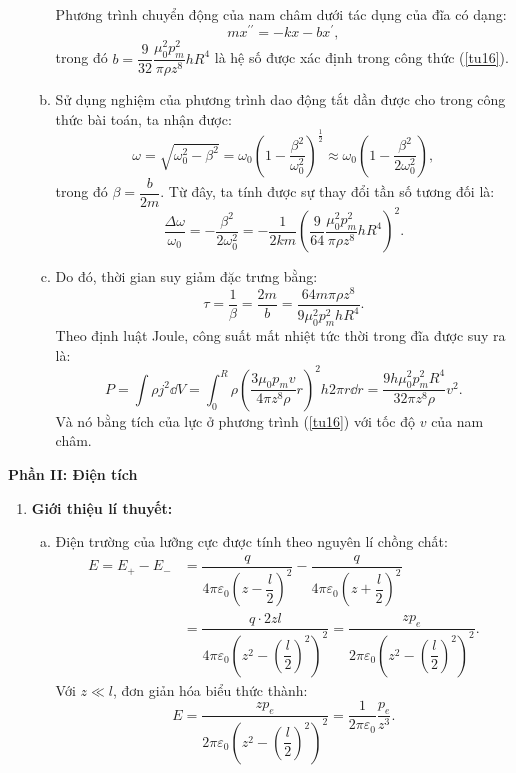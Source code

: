 \begin{loigiai}
\begin{enumerate}[1)]
\begin{enumerate}[a)]
\begin{align*}
\end{align*}
Phương trình chuyển động của nam châm dưới tác dụng của đĩa có dạng:
\[
m x^{\prime \prime}=-k x-b x^{\prime}, \tag{17}
\]
trong đó $b=\dfrac{9}{32} \dfrac{\mu_{0}^{2} p_{m}^{2}}{\pi \rho z^{8}} h R^{4}$ là hệ số được xác định trong công thức (\ref{tu16}).
\item Sử dụng nghiệm của phương trình dao động tắt dần được cho trong công thức bài toán, ta nhận được:
\[
\omega=\sqrt{\omega_{0}^{2}-\beta^{2}}=\omega_{0}\left(1-\dfrac{\beta^{2}}{\omega_{0}^{2}}\right)^{\frac{1}{2}} \approx \omega_{0}\left(1-\dfrac{\beta^{2}}{2 \omega_{0}^{2}}\right), \tag{18}
\]
trong đó $\beta= \dfrac{b}{2m}$. Từ đây, ta tính được sự thay đổi tần số tương đối là:
\[
\dfrac{\Delta \omega}{\omega_{0}}=-\dfrac{\beta^{2}}{2 \omega_{0}^{2}}=-\dfrac{1}{2 k m}\left(\dfrac{9}{64} \dfrac{\mu_{0}^{2} p_{m}^{2}}{\pi \rho z^{8}} h R^{4}\right)^{2}. 
\]
\item Do đó, thời gian suy giảm đặc trưng bằng:
\[
\tau=\dfrac{1}{\beta}=\dfrac{2 m}{b}=\dfrac{64 m \pi \rho z^{8}}{9 \mu_{0}^{2} p_{m}^{2} h R^{4}}.
\]
Theo định luật Joule, công suất mất nhiệt tức thời trong đĩa được suy ra là:
\[
P=\int \rho j^{2} \dd V=\int_{0}^{R} \rho\left(\dfrac{3 \mu_{0} p_{m} v}{4 \pi z^{8} \rho} r\right)^{2} h 2 \pi r \dd r=\dfrac{9 h \mu_{0}^{2} p_{m}^{2} R^{4}}{32 \pi z^{8} \rho} v^{2}.
\]
Và nó bằng tích của lực ở phương trình (\ref{tu16}) với tốc độ $v$ của nam châm.
\end{enumerate}    
\end{enumerate}
\begin{center}
\textbf{Phần II: Điện tích}
\end{center}
\begin{enumerate}[1)]
\item \textbf{Giới thiệu lí thuyết:}
\begin{enumerate}[a)]
    \item Điện trường của lưỡng cực được tính theo nguyên lí chồng chất: 
\begin{align*}
E=E_{+}-E_{-}&=\dfrac{q}{4 \pi \varepsilon_{0}\left(z-\dfrac{l}{2}\right)^{2}}-\dfrac{q}{4 \pi \varepsilon_{0}\left(z+\dfrac{l}{2}\right)^{2}}\\
&=\dfrac{q \cdot 2 z l}{4 \pi \varepsilon_{0}\left(z^{2}-\left(\dfrac{l}{2}\right)^{2}\right)^{2}}=\dfrac{z p_{e}}{2 \pi \varepsilon_{0}\left(z^{2}-\left(\dfrac{l}{2}\right)^{2}\right)^{2}}. \tag{19}
    \end{align*}
    Với $z\ll l$, đơn giản hóa biểu thức thành:
    \[
E=\dfrac{z p_{e}}{2 \pi \varepsilon_{0}\left(z^{2}-\left(\dfrac{l}{2}\right)^{2}\right)^{2}}=\dfrac{1}{2 \pi \varepsilon_{0}} \dfrac{p_{e}}{z^{3}}. \tag{20}
\]
\end{enumerate}
\end{enumerate}
\end{loigiai}
